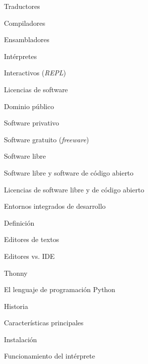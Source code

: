 \begin{longenum}
\begin{longenum}
        \begin{longenum}
            \item Traductores
            \item Compiladores
            \begin{longenum}
                \item Ensambladores
            \end{longenum}
            \item Intérpretes
            \begin{longenum}
                \item Interactivos (\textit{REPL})
            \end{longenum}
            \item Licencias de software
            \begin{longenum}
                \item Dominio público
                \item Software privativo
                \item Software gratuito (\textit{freeware})
                \item Software libre
                \begin{longenum}
                    \item Software libre y software de código abierto
                    \item Licencias de software libre y de código abierto
                \end{longenum}
            \end{longenum}
        \end{longenum}
        \item Entornos integrados de desarrollo
        \begin{longenum}
            \item Definición
            \item Editores de textos
            \item Editores vs. IDE
            \item Thonny
        \end{longenum}
        \item El lenguaje de programación Python
        \begin{longenum}
            \item Historia
            \item Características principales
            \item Instalación
            \item Funcionamiento del intérprete

\end{longenum}
\end{longenum}
\end{longenum}
